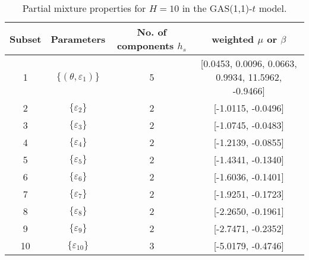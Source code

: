 \begin{table}[h] 
\centering 
\caption{Partial mixture properties for $H=10$ in the GAS(1,1)-$t$ model.} 
\label{tab:pmits_t_gas} 
\begin{tabular}{cccc}  
 Subset & Parameters& No. of components $h_{s}$ & weighted $\mu$ or $\beta$  \\ \hline 
1 & $\{(\theta,\varepsilon_{1})\}$ & 5 & [0.0453, 0.0096, 0.0663, 0.9934, 11.5962, -0.9466]   \\ [1ex] 
2 & $\{\varepsilon_{2}\}$ & 2 & [-1.0115, -0.0496]   \\ [1ex] 
3 & $\{\varepsilon_{3}\}$ & 2 & [-1.0745, -0.0483]   \\ [1ex] 
4 & $\{\varepsilon_{4}\}$ & 2 & [-1.2139, -0.0855]   \\ [1ex] 
5 & $\{\varepsilon_{5}\}$ & 2 & [-1.4341, -0.1340]   \\ [1ex] 
6 & $\{\varepsilon_{6}\}$ & 2 & [-1.6036, -0.1401]   \\ [1ex] 
7 & $\{\varepsilon_{7}\}$ & 2 & [-1.9251, -0.1723]   \\ [1ex] 
8 & $\{\varepsilon_{8}\}$ & 2 & [-2.2650, -0.1961]   \\ [1ex] 
9 & $\{\varepsilon_{9}\}$ & 2 & [-2.7471, -0.2352]   \\ [1ex] 
10 & $\{\varepsilon_{10}\}$ & 3 & [-5.0179, -0.4746]   \\ [1ex] 
\hline 
\end{tabular} 
\end{table} 
